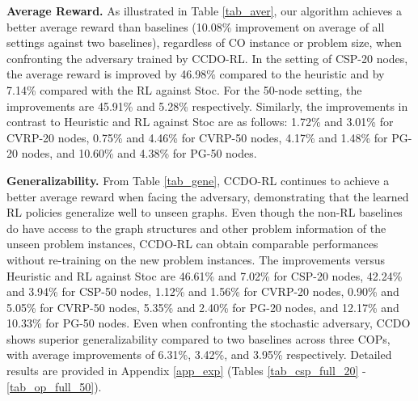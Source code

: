 \textbf{Average Reward.}  As illustrated in Table \ref{tab_aver}, our algorithm achieves a better average reward than baselines (10.08\% improvement on average of all settings against two baselines), regardless of CO instance or problem size, when confronting the adversary trained by CCDO-RL. In the setting of CSP-20 nodes, the average reward is improved by 46.98\% compared to the heuristic and by 7.14\% compared with the RL against Stoc. For the 50-node setting, the improvements are 45.91\% and 5.28\% respectively. Similarly, the improvements in contrast to Heuristic and RL against Stoc are as follows: 1.72\% and 3.01\%  for CVRP-20 nodes, 0.75\% and 4.46\% for CVRP-50 nodes, 4.17\% and 1.48\% for PG-20 nodes, and 10.60\% and 4.38\% for PG-50 nodes.

\textbf{Generalizability.} From Table \ref{tab_gene}, CCDO-RL continues to achieve a better average reward when facing the adversary, demonstrating that the learned RL policies generalize well to unseen graphs. Even though the non-RL baselines do have access to the graph structures and other problem information of the unseen problem instances, CCDO-RL can obtain comparable performances without re-training on the new problem instances. The improvements versus Heuristic and RL against Stoc are 46.61\% and 7.02\% for CSP-20 nodes, 42.24\% and 3.94\% for CSP-50 nodes, 1.12\% and 1.56\% for CVRP-20 nodes, 0.90\% and 5.05\% for CVRP-50 nodes, 5.35\% and 2.40\% for PG-20 nodes, and 12.17\% and 10.33\% for PG-50 nodes. Even when confronting the stochastic adversary, CCDO shows superior generalizability compared to two baselines across three COPs, with average improvements of 6.31\%, 3.42\%, and 3.95\% respectively. Detailed results are provided in Appendix \ref{app_exp} (Tables \ref{tab_csp_full_20} - \ref{tab_op_full_50}). 

